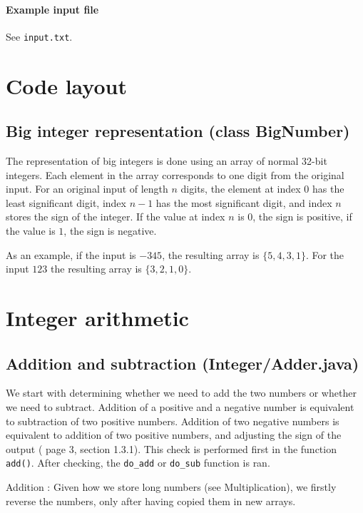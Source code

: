 \documentclass[a4paper]{article}
\begin{document}
\paragraph{Example input file}
See \texttt{input.txt}.


\section{Code layout}

\subsection{Big integer representation (class BigNumber)}

The representation of big integers is done using an array of normal 32-bit integers.
Each element in the array corresponds to one digit from the original input.
For an original input of length $n$ digits, the element at index $0$ has the least significant digit,
index $n-1$ has the most significant digit, and index $n$ stores the sign of the integer.
If the value at index $n$ is 0, the sign is positive, if the value is $1$, the sign is negative.

As an example, if the input is $-345$, the resulting array is $\{5, 4, 3, 1\}$.
For the input $123$ the resulting array is $\{3, 2, 1, 0\}$.


\section{Integer arithmetic}

\subsection{Addition and subtraction (Integer/Adder.java)}

We start with determining whether we need to add the two numbers or whether we need to subtract.
Addition of a positive and a negative number is equivalent to subtraction of two positive numbers.
Addition of two negative numbers is equivalent to addition of two positive numbers, and adjusting the sign of the output
(\cite{ant} page 3, section 1.3.1).
This check is performed first in the function \texttt{add()}.
After checking, the \texttt{do\_add} or \texttt{do\_sub} function is ran.

Addition : Given how we store long numbers (see Multiplication), we firstly reverse the numbers, only after having copied them in new arrays. 
\end{document}
